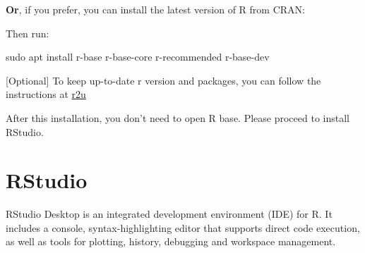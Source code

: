 \documentclass[
  letterpaper,
  DIV=11,
  numbers=noendperiod]{scrreprt}
\newenvironment{Shaded}{\begin{snugshade}}{\end{snugshade}}
\newcommand{\AttributeTok}[1]{\textcolor[rgb]{0.40,0.45,0.13}{#1}}
\newcommand{\CommentTok}[1]{\textcolor[rgb]{0.37,0.37,0.37}{#1}}
\newcommand{\ExtensionTok}[1]{\textcolor[rgb]{0.00,0.23,0.31}{#1}}
\newcommand{\FunctionTok}[1]{\textcolor[rgb]{0.28,0.35,0.67}{#1}}
\newcommand{\KeywordTok}[1]{\textcolor[rgb]{0.00,0.23,0.31}{\textbf{#1}}}
\newcommand{\NormalTok}[1]{\textcolor[rgb]{0.00,0.23,0.31}{#1}}
\newcommand{\StringTok}[1]{\textcolor[rgb]{0.13,0.47,0.30}{#1}}
\newcommand{\VariableTok}[1]{\textcolor[rgb]{0.07,0.07,0.07}{#1}}
\begin{document}
\textbf{Or}, if you prefer, you can install the latest version of R from
CRAN:

\begin{Shaded}
\end{Shaded}

Then run:

\begin{Shaded}
\begin{Highlighting}[]
\FunctionTok{sudo}\NormalTok{ apt install r{-}base r{-}base{-}core r{-}recommended r{-}base{-}dev}
\end{Highlighting}
\end{Shaded}

{[}Optional{]} To keep up-to-date r version and packages, you can follow
the instructions at \href{https://eddelbuettel.github.io/r2u/}{r2u}

After this installation, you don't need to open R base. Please proceed
to install RStudio.

\section{RStudio}\label{rstudio}

RStudio Desktop is an integrated development environment (IDE) for R. It
includes a console, syntax-highlighting editor that supports direct code
execution, as well as tools for plotting, history, debugging and
workspace management.
\end{document}
